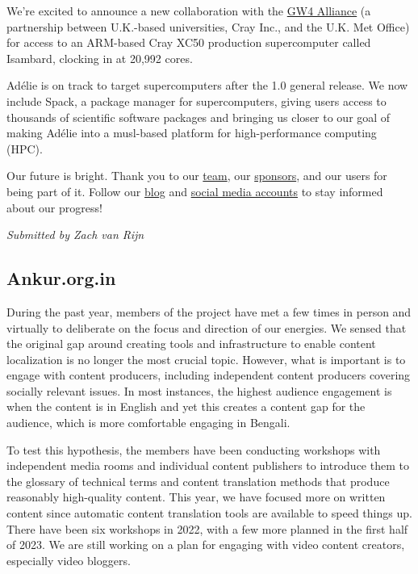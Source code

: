 \documentclass[a4paper]{report}
\begin{document}
We're excited to announce a new collaboration with the \href{https://gw4.ac.uk/news/new-strategic-partnership-launched-between-gw4-alliance-and-the-western-gateway/}{GW4 Alliance} (a partnership between U.K.-based universities, Cray Inc., and the U.K. Met Office) for access to an ARM-based Cray XC50 production supercomputer called Isambard, clocking in at 20,992 cores.

Adélie is on track to target supercomputers after the 1.0 general release. We now include Spack, a package manager for supercomputers, giving users access to thousands of scientific software packages and bringing us closer to our goal of making Adélie into a musl-based platform for high-performance computing (HPC).

Our future is bright. Thank you to our \href{https://git.adelielinux.org/groups/adelie/-/group_members}{team}, our \href{https://www.adelielinux.org/sponsors/}{sponsors}, and our users for being part of it. Follow our \href{https://blog.adelielinux.org/}{blog} and \href{https://www.adelielinux.org/contact/}{social media accounts} to stay informed about our progress!

{\em Submitted by Zach van Rijn}

\subsection{Ankur.org.in}

During the past year, members of the project have met a few times in person and virtually to deliberate on the focus and direction of our energies. We sensed that the original gap around creating tools and infrastructure to enable content localization is no longer the most crucial topic. However, what is important is to engage with content producers, including independent content producers covering socially relevant issues. In most instances, the highest audience engagement is when the content is in English and yet this creates a content gap for the audience, which is more comfortable engaging in Bengali.

To test this hypothesis, the members have been conducting workshops
with independent media rooms and individual content publishers to introduce them to the glossary of technical terms and content translation methods that produce reasonably high-quality content. This year, we have focused more on written content since automatic content translation tools are available to speed things up. There have been six workshops in 2022, with a few more planned in the first half of 2023. We are still working on a plan for engaging with video content creators, especially video bloggers.
\end{document}

